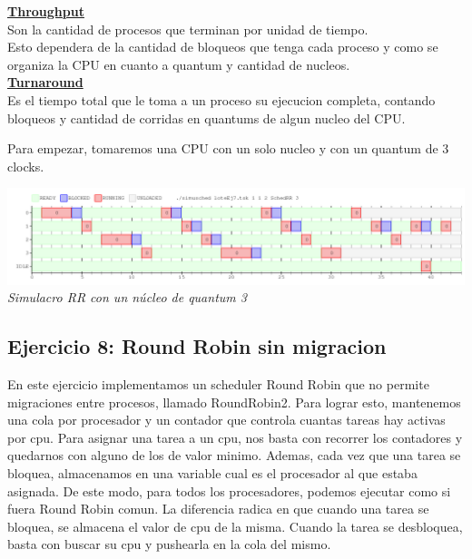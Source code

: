 \textbf{\underline{Throughput}}\\
Son la cantidad de procesos que terminan por unidad de tiempo.\\
Esto dependera de la cantidad de bloqueos que tenga cada proceso y como se organiza la CPU en cuanto a quantum y cantidad de nucleos.\\

\textbf{\underline{Turnaround}}\\
Es el tiempo total que le toma a un proceso su ejecucion completa, contando bloqueos y cantidad de corridas en quantums de algun nucleo del CPU.

\vspace{1 cm}
Para empezar, tomaremos una CPU con un solo nucleo y con un quantum de 3 clocks.\\

\vspace{\baselineskip}
\begin{center}
\includegraphics[scale=0.45]{../tp1/Test/resEj7Co1.png}
\\
\vspace{1pt}
\footnotesize\textit{Simulacro RR con un n\'ucleo de quantum 3}
\end{center}
\vspace{\baselineskip}

\subsection{Ejercicio 8: Round Robin sin migracion}

En este ejercicio implementamos un scheduler Round Robin  que no permite migraciones entre procesos, llamado RoundRobin2. Para lograr esto, mantenemos una
cola por procesador 
y un contador que controla cuantas tareas hay activas por cpu. Para asignar una tarea a un cpu, nos basta con recorrer los contadores 
y quedarnos con alguno
de los de valor minimo. Ademas, cada vez que una tarea se bloquea, almacenamos en una variable cual
es el procesador al que estaba asignada. De este modo, para todos los procesadores, podemos ejecutar como si fuera Round Robin comun. La diferencia
radica en que cuando una tarea se bloquea, se almacena el valor de cpu de la misma. Cuando la tarea se desbloquea, basta con buscar su
cpu y pushearla en la cola del mismo.

